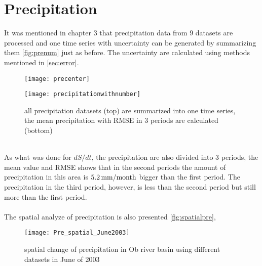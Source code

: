 \section{Precipitation}
It was mentioned in chapter 3 that precipitation data from 9 datasets are processed and one time series with uncertainty can be generated by summarizing them \autoref{fig:prenum} just as before. The uncertainty are calculated using methods mentioned in \autoref{sec:error}.
\begin{figure}[htbp]\centering
	\begin{minipage}[t]{0.9\textwidth}
		\centering
		\texttt{[image: precenter]} %
	\end{minipage}
	\begin{minipage}[t]{0.9\textwidth}
		\centering
		\texttt{[image: precipitationwithnumber]} %
	\end{minipage}
	\caption{all precipitation datasets (top) are summarized into one time series, the mean precipitation with RMSE in 3 periods are calculated (bottom)}
	\label{fig:prenum}
\end{figure}\\
As what was done for $dS/dt$, the precipitation are also divided into 3 periods, the mean value and RMSE shows that in the second periods the amount of precipitation in this area is $5.2\,\mathrm{mm/month}$ bigger than the first period. The precipitation in the third period, however, is less than the second period but still more than the first period.\\\\
The spatial analyze of precipitation is also presented \autoref{fig:spatialpre}, 
\begin{figure}[htbp]\centering
 	\centering
 	\texttt{[image: Pre\_spatial\_June2003]} %
 	\caption{spatial change of precipitation in Ob river basin using different datasets in June of 2003} 
 	\label{fig:spatialpre}
\end{figure}
\clearpage
